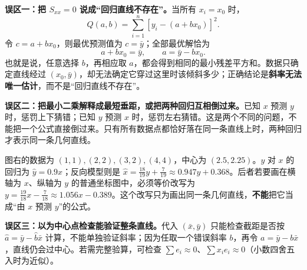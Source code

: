 \clearpage
\begin{trapbox}


\textbf{误区一：把 $S_{xx}=0$ 说成“回归直线不存在”。}\quad 当所有 $x_i=x_0$ 时，
\[
Q(a,b)=\sum_{i=1}^n\left[y_i-(a+bx_0)\right]^2.
\]
令 $c=a+bx_0$，则最优预测值为 $c=\bar y$；全部最优解恰为
\[
a+bx_0=\bar y,\qquad a=\bar y-bx_0.
\]
也就是说，任意选择 $b$，再相应取 $a$，都会得到相同的最小残差平方和。数据只确定直线经过 $(x_0,\bar y)$，却无法确定它穿过这里时该倾斜多少；正确结论是\textbf{斜率无法唯一估计}，而不是“回归直线不存在”。

\textbf{误区二：把最小二乘解释成最短垂距，或把两种回归互相倒过来。}\quad 已知 $x$ 预测 $y$ 时，惩罚上下猜错；已知 $y$ 预测 $x$ 时，惩罚左右猜错。这是两个不同的问题，不能把一个公式直接倒过来。只有所有数据点都恰好落在同一条直线上时，两种回归才表示同一条几何直线。

图右的数据为 $(1,1),(2,2),(3,2),(4,4)$，中心为 $(2.5,2.25)$。$y$ 对 $x$ 的回归为 $\hat y=0.9x$；反向模型则是 $\hat x=\frac{18}{19}y+\frac7{19}\approx0.947y+0.368$。后者若要画在横轴为 $x$、纵轴为 $y$ 的普通坐标图中，必须等价改写为 $y=\frac{19}{18}x-\frac7{18}\approx1.056x-0.389$。这个改写只为画出同一条几何直线，\textbf{不能}把它当成“由 $x$ 预测 $y$”的公式。

\textbf{误区三：以为中心点检查能验证整条直线。}\quad 代入 $(\bar x,\bar y)$ 只能检查截距是否按 $\hat a=\bar y-\hat b\bar x$ 计算，不能单独验证斜率；因为任取一个错误斜率 $b$，再令 $a=\bar y-b\bar x$，直线仍会过中心。若需完整验算，可检查 $\sum e_i\approx0$、$\sum x_ie_i\approx0$（小数四舍五入时为近似）。
\end{trapbox}
